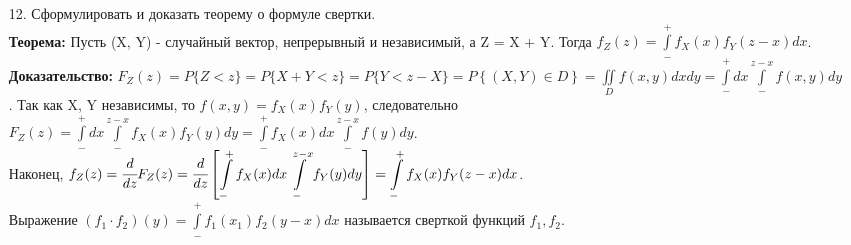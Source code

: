 \documentclass[a4paper]{article}
\begin{document}
\begin{enumerate}
\item[12.] Сформулировать и доказать теорему о формуле свертки. \\
\textbf{Теорема:} Пусть (X, Y) - случайный вектор, непрерывный и независимый, а Z = X + Y. Тогда $\displaystyle  f_Z(z) = \int\limits_{-}^{+} f_X(x) f_Y(z - x) dx$. \\
\textbf{Доказательство:} $\displaystyle  F_Z(z) = P\{Z < z\} = P\{X + Y < z\} = P\{Y < z - X\} = P\left\{(X,Y) \in D \right\} = \iint\limits_{D} f(x,y) dxdy = \int\limits_{-}^{+} dx \int\limits_{-}^{z - x} f(x,y) dy$. Так как X, Y независимы, то $f(x,y) = f_X(x) f_Y(y)$, следовательно $\displaystyle  F_Z(z) = \int\limits_{-}^{+} dx \int\limits_{-}^{z - x} f_X(x) f_Y(y) dy = \int\limits_{-}^{+} f_X(x) dx \int\limits_{-}^{z - x} f(y)dy$. \\
Наконец, $\displaystyle  f_Z(z) = \cfrac{d}{dz} F_Z(z) = \cfrac{d}{dz} \left[ \int\limits_{-}^{+} f_X(x)dx \int\limits_{-}^{z - x} f_Y(y)dy \right] = \int\limits_{-}^{+} f_X(x) f_Y(z - x) dx$. \\
Выражение $\displaystyle  (f_1 \cdot f_2)(y) = \int\limits_{-}^{+} f_1(x_1) f_2(y - x) dx$ называется сверткой функций $f_1, f_2$. %



\end{enumerate}
\end{document}

